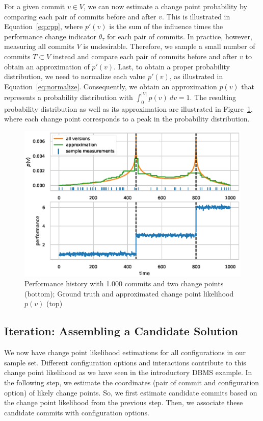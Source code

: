 \documentclass[sigconf]{acmart}
\begin{document}
	For a given commit $v\in V$, we can now estimate a change point probability by comparing each pair of commits before and after $v$.
	This is illustrated in Equation~\ref{eq:cpp}, where $p'(v)$ is the sum of the influence times the performance change indicator $\theta_\tau$ for each pair of commits.
	In practice, however, measuring all commits $V$ is undesirable.
	Therefore, we sample a small number of commits $T \subset V$ instead and compare each pair of commits before and after $v$ to obtain an approximation of $p'(v)$.
	Last, to obtain a proper probability distribution, we need to normalize each value $p'(v)$, as illustrated in Equation~\ref{eq:normalize}.
	Consequently, we obtain an approximation $p(v)$ that represents a probability distribution with $\int_0^{\vert V\vert} p(v)\ dv = 1$. The resulting probability distribution as well as its approximation are illustrated in Figure~\ref{fig:cpp_example}, where each change point corresponds to a peak in the probability distribution.
	
	\begin{figure}
		\centering
		\includegraphics[width=\linewidth]{images/cpp_example.eps}
		\caption{Performance history with 1.000 commits and two change points (bottom); Ground truth and approximated change point likelihood $p(v)$ (top)}
		\label{fig:cpp_example}
	\end{figure}
	
	\subsection{Iteration: Assembling a Candidate Solution}\label{sec:candidatesolution}
	We now have change point likelihood estimations for all configurations in our sample set. 
	Different configuration options and interactions contribute to this change point likelihood as we have seen in the introductory DBMS example. 
	In the following step, we estimate the coordinates (pair of commit and configuration option) of likely change points. 
	So, we first estimate candidate commits based on the change point likelihood from the previous step. 
	Then, we associate these candidate commits with configuration options.
	
\end{document}
